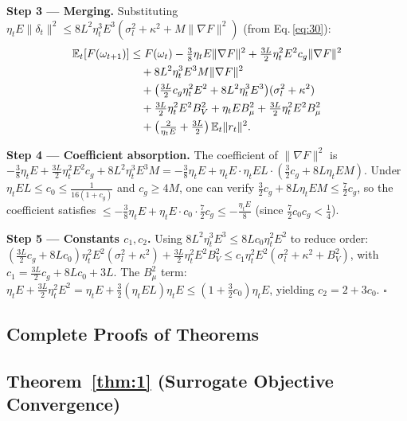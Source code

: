 \documentclass[journal]{IEEEtran}
\begin{document}
\noindent\textbf{Step 3 --- Merging.}
Substituting \(\eta_t E\|\delta_t\|^2 \le 8L^2\eta_t^3 E^3(\sigma_l^2 + \kappa^2 + M\|\nabla F\|^2)\) (from Eq.\,\eqref{eq:30}):
\begin{align*}
  \mathbb E_t[F(\omega_{t+1})]
  &\le F(\omega_t)
     - \tfrac{3}{8}\eta_t E\|\nabla F\|^2
     + \tfrac{3L}{2}\eta_t^2 E^2 c_g\|\nabla F\|^2 \notag\\
  &\quad + 8L^2\eta_t^3 E^3 M\|\nabla F\|^2 \notag\\
  &\quad + \bigl(\tfrac{3L}{2}c_g\eta_t^2 E^2 + 8L^2\eta_t^3 E^3\bigr)(\sigma_l^2 + \kappa^2) \\
  &\quad + \tfrac{3L}{2}\eta_t^2 E^2 B_V^2
     + \eta_t E B_\mu^2
     + \tfrac{3L}{2}\eta_t^2 E^2 B_\mu^2 \notag\\
  &\quad + \bigl(\tfrac{2}{\eta_t E} + \tfrac{3L}{2}\bigr)\,\mathbb E_t\|r_t\|^2.
\end{align*}

\noindent\textbf{Step 4 --- Coefficient absorption.}
The coefficient of \(\|\nabla F\|^2\) is
\(-\frac{3}{8}\eta_t E + \frac{3L}{2}\eta_t^2 E^2 c_g + 8L^2\eta_t^3 E^3 M
 = -\frac{3}{8}\eta_t E + \eta_t E \cdot \eta_t E L \cdot (\frac{3}{2}c_g + 8L\eta_t E M)\).
Under \(\eta_t E L \le c_0 \le \frac{1}{16(1+c_g)}\) and \(c_g \ge 4M\),
one can verify \(\frac{3}{2}c_g + 8L\eta_t E M \le \frac{7}{2}c_g\),
so the coefficient satisfies
\(\le -\frac{3}{8}\eta_t E + \eta_t E \cdot c_0 \cdot \frac{7}{2}c_g
   \le -\frac{\eta_t E}{8}\)
(since \(\frac{7}{2}c_0 c_g < \frac{1}{4}\)).

\noindent\textbf{Step 5 --- Constants \(c_1, c_2\).}
Using \(8L^2\eta_t^3 E^3 \le 8L c_0 \eta_t^2 E^2\) to reduce order:
\((\frac{3L}{2}c_g + 8L c_0)\eta_t^2 E^2(\sigma_l^2 + \kappa^2)
   + \frac{3L}{2}\eta_t^2 E^2 B_V^2
 \le c_1\eta_t^2 E^2(\sigma_l^2 + \kappa^2 + B_V^2)\),
with \(c_1 = \frac{3L}{2}c_g + 8L c_0 + 3L\).
The \(B_\mu^2\) term:
\(\eta_t E + \frac{3L}{2}\eta_t^2 E^2
 = \eta_t E + \frac{3}{2}(\eta_t E L)\eta_t E
 \le (1 + \frac{3}{2}c_0)\eta_t E\),
yielding \(c_2 = 2 + 3c_0\). \(\square\)

\subsection{Complete Proofs of Theorems}

\subsection*{Theorem~\ref{thm:1} (Surrogate Objective Convergence)}
\end{document}
